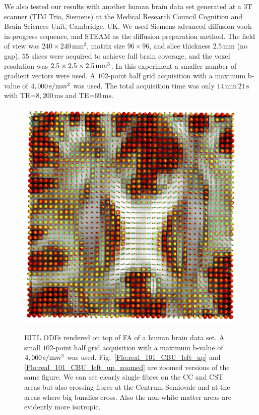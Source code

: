 \documentclass{bioinfo}
\begin{document}
We also tested our results with another human brain data set generated
at a 3T scanner (TIM Trio, Siemens) at the Medical Research Council
Cognition and Brain Sciences Unit, Cambridge, UK. We used Siemens
advanced diffusion work-in-progress sequence, and STEAM \cite{merboldt1992diffusion,MAB04}
as the diffusion preparation method. The field of view was $240\times240\,\textrm{mm}^{2}$,
matrix size $96\times96$, and slice thickness $2.5\,\textrm{mm}$
(no gap). $55$ slices were acquired to achieve full brain coverage,
and the voxel resolution was $2.5\times2.5\times2.5\,\textrm{mm\ensuremath{{}^{3}}}$.
In this experiment a smaller number of gradient vectors were used.
A $102$-point half grid acquisition with a maximum b-value of $4,000\,\textrm{s}/\textrm{m\ensuremath{m^{2}}}$
was used. The total acquisition time was only $14\,\textrm{min}\,21\,\textrm{s}$
with TR=$8,200\,\textrm{ms}$ and TE=$69\,\textrm{ms}$.

%
\begin{figure}
[th!]

\begin{centering}
\includegraphics[scale=0.3]{figures/real_101_eitl_005}
\par\end{centering}

\caption{EITL ODFs rendered on top of FA of a human brain data set. A small
$102$-point half grid acquisition with a maximum b-value of $4,000\,\textrm{s}/\textrm{m\ensuremath{m^{2}}}$
was used. Fig.~\ref{Flo:real_101_CBU_left_up} and \ref{Flo:real_101_CBU_left_up_zoomed}
are zoomed versions of the same figure. We can see clearly single
fibres on the CC and CST areas but also crossing fibres at the Centrum
Semiovale and at the areas where big bundles cross. Also the non-white
matter areas are evidently more isotropic.}


\centering{}\label{Flo:real_101_CBU}
\end{figure}
\end{document}
